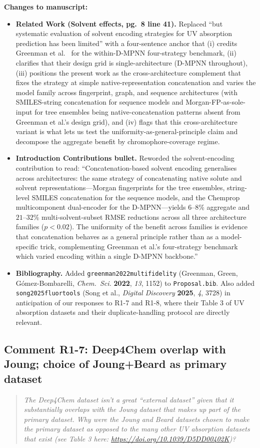 \documentclass[11pt]{article}
\newenvironment{reviewer}{%
  \begin{quote}\itshape\color{black!70}}{%
  \end{quote}}
\newenvironment{changes}{%
  \noindent\textbf{Changes to manuscript:}
  \begin{itemize}[leftmargin=2em,itemsep=2pt]}{%
  \end{itemize}\medskip}
\begin{document}
\begin{changes}
  \item \textbf{Related Work (Solvent effects, pg.\ 8 line 41).} Replaced ``but systematic evaluation of solvent encoding strategies for UV absorption prediction has been limited'' with a four-sentence anchor that (i) credits Greenman et al.~\cite{greenman2022multifidelity} for the within-D-MPNN four-strategy benchmark, (ii) clarifies that their design grid is single-architecture (D-MPNN throughout), (iii) positions the present work as the cross-architecture complement that fixes the strategy at simple native-representation concatenation and varies the model family across fingerprint, graph, and sequence architectures (with SMILES-string concatenation for sequence models and Morgan-FP-as-sole-input for tree ensembles being native-concatenation patterns absent from Greenman et al.'s design grid), and (iv) flags that this cross-architecture variant is what lets us test the uniformity-as-general-principle claim and decompose the aggregate benefit by chromophore-coverage regime.
  \item \textbf{Introduction Contributions bullet.} Reworded the solvent-encoding contribution to read: ``Concatenation-based solvent encoding generalises across architectures: the same strategy of concatenating native solute and solvent representations---Morgan fingerprints for the tree ensembles, string-level SMILES concatenation for the sequence models, and the Chemprop multicomponent dual-encoder for the D-MPNN---yields $6$--$8$\% aggregate and $21$--$32$\% multi-solvent-subset RMSE reductions across all three architecture families ($p < 0.02$). The uniformity of the benefit across families is evidence that concatenation behaves as a general principle rather than as a model-specific trick, complementing Greenman et al.'s four-strategy benchmark which varied encoding within a single D-MPNN backbone.''
  \item \textbf{Bibliography.} Added \texttt{greenman2022multifidelity} (Greenman, Green, G\'omez-Bombarelli, \textit{Chem.\ Sci.} \textbf{2022}, \textit{13}, 1152) to \texttt{Proposal.bib}. Also added \texttt{song2025fluortools} (Song et al., \textit{Digital Discovery} \textbf{2025}, \textit{4}, 3728) in anticipation of our responses to R1-7 and R1-8, where their Table 3 of UV absorption datasets and their duplicate-handling protocol are directly relevant.
\end{changes}

\subsection*{Comment R1-7: Deep4Chem overlap with Joung; choice of Joung+Beard as primary dataset}
\begin{reviewer}
The Deep4Chem dataset isn't a great ``external dataset'' given that it substantially overlaps with the Joung dataset that makes up part of the primary dataset. Why were the Joung and Beard datasets chosen to make the primary dataset as opposed to the many other UV absorption datasets that exist (see Table 3 here: \url{https://doi.org/10.1039/D5DD00402K})?
\end{reviewer}
\end{document}
